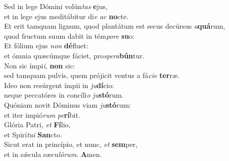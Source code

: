 \evenverse Sed in lege Dómini volún\textit{tas} \textbf{e}jus,~\*\\
\evenverse et in lege ejus meditábitur di\textit{e} \textit{ac} \textbf{no}cte.\\
\oddverse Et erit tamquam lignum, quod plantátum est secus decúrsus \textit{a}\textbf{quá}rum,~\*\\
\oddverse quod fructum suum dabit in tém\textit{po}\textit{re} \textbf{su}o:\\
\evenverse Et fólium ejus \textit{non} \textbf{dé}fluet:~\*\\
\evenverse et ómnia quæcúmque fáciet, pro\textit{spe}\textit{ra}\textbf{bún}tur.\\
\oddverse Non sic ímpi\textit{i}, \textbf{non} sic:~\*\\
\oddverse sed tamquam pulvis, quem prójicit ventus a fá\textit{ci}\textit{e} \textbf{ter}ræ.\\
\evenverse Ideo non resúrgent ímpii in \textit{ju}\textbf{dí}cio:~\*\\
\evenverse neque peccatóres in concíli\textit{o} \textit{ju}\textbf{stó}rum.\\
\oddverse Quóniam novit Dóminus viam \textit{ju}\textbf{stó}rum:~\*\\
\oddverse et iter impió\textit{rum} \textit{pe}\textbf{rí}bit.\\
\evenverse Glória Patri, \textit{et} \textbf{Fí}lio,~\*\\
\evenverse et Spirí\textit{tu}\textit{i} \textbf{San}cto.\\
\oddverse Sicut erat in princípio, et nunc, \textit{et} \textbf{sem}per,~\*\\
\oddverse et in sǽcula sæcu\textit{ló}\textit{rum}. \textbf{A}men.\\
